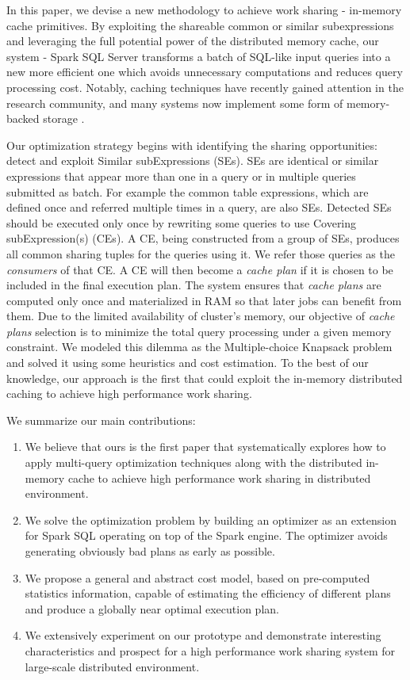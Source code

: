 In this paper, we devise a new methodology to achieve work sharing - in-memory cache primitives. By exploiting the shareable common or similar subexpressions and leveraging the full potential power of the distributed memory cache, our system - Spark SQL Server transforms a batch of SQL-like input queries into a new more efficient one which avoids unnecessary computations and reduces query processing cost. Notably, caching techniques have recently gained attention in the research community, and many systems now implement some form of memory-backed storage \cite{tachyon, hdfs}.

Our optimization strategy begins with identifying the sharing opportunities: detect and exploit Similar subExpressions (SEs). SEs are identical or similar expressions that appear more than one in a query or in multiple queries submitted as batch. For example the common table expressions, which are defined once and referred multiple times in a query, are also SEs. Detected SEs should be executed only once by rewriting some queries to use Covering subExpression(s) (CEs). A CE, being constructed from a group of SEs, produces all common sharing tuples for the queries using it. We refer those queries as the \emph{consumers} of that CE. A CE will then become a \emph{cache plan} if it is chosen to be included in the final execution plan. The system ensures that \emph{cache plans} are computed only once and materialized in RAM so that later jobs can benefit from them. Due to the limited availability of cluster's memory, our objective of \emph{cache plans} selection is to minimize the total query processing under a given memory constraint. We modeled this dilemma as the Multiple-choice Knapsack problem and solved it using some heuristics and cost estimation. To the best of our knowledge, our approach is the first that could exploit the in-memory distributed caching to achieve high performance work sharing.

We summarize our main contributions:
\begin{enumerate}
	\item We believe that ours is the first paper that systematically explores how to apply multi-query optimization techniques along with the distributed in-memory cache to achieve high performance work sharing in distributed environment.
	\item We solve the optimization problem by building an optimizer as an extension for Spark SQL operating on top of the Spark engine. The optimizer avoids generating obviously bad plans as early as possible.
	\item We propose a general and abstract cost model, based on pre-computed statistics information, capable of estimating the efficiency of different plans and produce a globally near optimal execution plan.
	\item We extensively experiment on our prototype and demonstrate interesting characteristics and prospect for a high performance work sharing system for large-scale distributed environment.
\end{enumerate}

